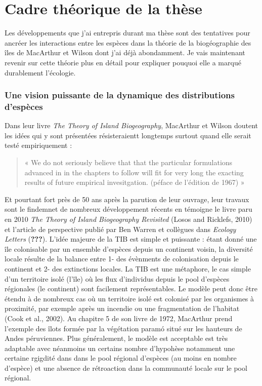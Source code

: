 \section*{Cadre théorique de la
thèse}\label{cadre-thuxe9orique-de-la-thuxe8se}

Les développements que j'ai entrepris durant ma thèse sont des
tentatives pour ancréer les interactions entre les espèces dans la
théorie de la biogéographie des îles de MacArthur et Wilson dont j'ai
déjà abondamment. Je vais maintenant revenir sur cette théorie plus en
détail pour expliquer pouquoi elle a marqué durablement l'écologie.

\subsubsection{Une vision puissante de la dynamique des distributions
d'espèces}\label{une-vision-puissante-de-la-dynamique-des-distributions-despuxe8ces}

Dans leur livre \emph{The Theory of Island Biogeography}, MacArthur et
Wilson doutent les idées qui y sont présentées résisteraientt longtemps
surtout quand elle serait testé empiriquement :

\begin{quote}
« We do not seriously believe that that the particular formulations
advanced in in the chapters to follow will fit for very long the
exacting results of future empirical invesitgation. (péface de l'édition
de 1967) »
\end{quote}

Et pourtant fort près de 50 ans après la parution de leur ouvrage, leur
travaux sont le findemnet de nombreux développement récents en témoigne
le livre paru en 2010 \emph{The Theory of Island Biogeography Revisited}
(Losos and Ricklefs, 2010) et l'article de perspective publié par Ben
Warren et collègues dans \emph{Ecology Letters} ({\textbf{???}}). L'idée
majeure de la TIB est simple et puissante : étant donné une île
colonisable par un ensemble d'espèces depuis un continent voisin, la
diversité locale résulte de la balance entre 1- des évènments de
colonisation depuis le continent et 2- des extinctions locales. La TIB
est une métaphore, le cas simple d'un territoire isolé (l'île) où les
flux d'individus depuis le pool d'espèces régionales (le continent) sont
facilement représentables. Le modèle peut donc être étendu à de nombreux
cas où un territoire isolé est colonisé par les organismes à proximité,
par exemple après un incendie ou une fragmentation de l'habitat (Cook et
al., 2002). Au chapitre 5 de son livre de 1972, MacArthur prend
l'exemple des îlots formée par la végétation paramó situé sur les
hauteurs de Andes péruviennes. Plus généralement, le modèle est
acceptable est très adaptable avec néanmoins un certains nombre
d'hypohèse notamment une certaine rgigdité dans dans le pool régional
d'espèces (au moins en nombre d'espèce) et une absence de rétroaction
dans la communauté locale sur le pool régional.


